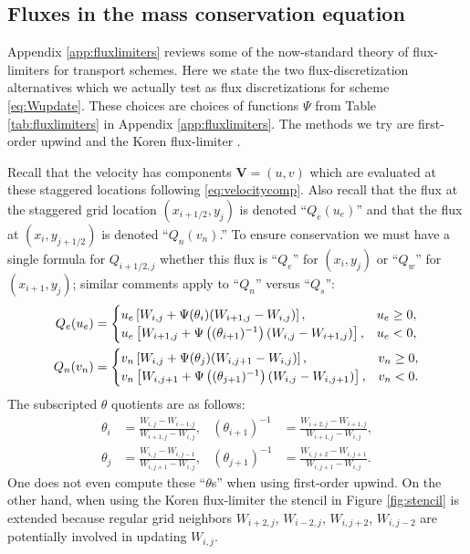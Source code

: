 \documentclass[11pt,final]{amsart}
\newcommand\bV{\mathbf{V}}
\begin{document}
\subsection*{Fluxes in the mass conservation equation}  Appendix \ref{app:fluxlimiters} reviews some of the now-standard theory of flux-limiters for transport schemes.  Here we state the two flux-discretization alternatives which we actually test as flux discretizations for scheme \eqref{eq:Wupdate}.  These choices are choices of functions $\Psi$ from Table \ref{tab:fluxlimiters} in Appendix \ref{app:fluxlimiters}.  The methods we try are first-order upwind and the Koren flux-limiter \citep{HundsdorferVerwer2010}.

Recall that the velocity has components $\bV=(u,v)$ which are evaluated at these staggered locations following \eqref{eq:velocitycomp}.  Also recall that the flux at the staggered grid location $(x_{i+1/2},y_j)$ is denoted ``$Q_e(u_e)$'' and that the flux at $(x_i,y_{j+1/2})$ is denoted ``$Q_n(v_n)$.''  To ensure conservation we must have a single formula for $Q_{i+1/2,j}$ whether this flux is ``$Q_e$'' for $(x_i,y_j)$ or ``$Q_w$'' for $(x_{i+1},y_j)$; similar comments apply to ``$Q_n$'' versus ``$Q_s$'':
\begin{align}
Q_e(u_e) &= \begin{cases} u_e \left[W_{i,j} + \Psi(\theta_{i}) (W_{i+1,j} - W_{i,j})\right], & u_e \ge 0, \\ u_e \left[W_{i+1,j} + \Psi\left((\theta_{i+1})^{-1}\right) (W_{i,j} - W_{i+1,j})\right], & u_e < 0, \end{cases} \label{eq:adfluxes} \\
Q_n(v_n) &= \begin{cases} v_n \left[W_{i,j} + \Psi(\theta_{j}) (W_{i,j+1} - W_{i,j})\right], & v_n \ge 0, \\ v_n \left[W_{i,j+1} + \Psi\left((\theta_{j+1})^{-1}\right) (W_{i,j} - W_{i,j+1})\right], & v_n < 0. \end{cases} \notag
\end{align}
The subscripted $\theta$ quotients are as follows:
\begin{align*}
\theta_i &= \frac{W_{i,j}-W_{i-1,j}}{W_{i+1,j} - W_{i,j}}, & (\theta_{i+1})^{-1} &= \frac{W_{i+2,j}-W_{i+1,j}}{W_{i+1,j} - W_{i,j}}, \\
\theta_j &= \frac{W_{i,j}-W_{i,j-1}}{W_{i,j+1} - W_{i,j}}, & (\theta_{j+1})^{-1} &= \frac{W_{i,j+2}-W_{i,j+1}}{W_{i,j+1} - W_{i,j}}.
\end{align*}
One does not even compute these ``$\theta$s'' when using first-order upwind.  On the other hand, when using the Koren flux-limiter the stencil in Figure \ref{fig:stencil} is extended because regular grid neighbors $W_{i+2,j}$, $W_{i-2,j}$, $W_{i,j+2}$, $W_{i,j-2}$ are potentially involved in updating $W_{i,j}$.
\end{document}
